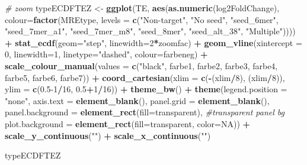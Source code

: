 \documentclass[
]{article}
\newenvironment{Shaded}{\begin{snugshade}}{\end{snugshade}}
\newcommand{\AttributeTok}[1]{\textcolor[rgb]{0.13,0.29,0.53}{#1}}
\newcommand{\CommentTok}[1]{\textcolor[rgb]{0.56,0.35,0.01}{\textit{#1}}}
\newcommand{\ConstantTok}[1]{\textcolor[rgb]{0.56,0.35,0.01}{#1}}
\newcommand{\DecValTok}[1]{\textcolor[rgb]{0.00,0.00,0.81}{#1}}
\newcommand{\FloatTok}[1]{\textcolor[rgb]{0.00,0.00,0.81}{#1}}
\newcommand{\FunctionTok}[1]{\textcolor[rgb]{0.13,0.29,0.53}{\textbf{#1}}}
\newcommand{\NormalTok}[1]{#1}
\newcommand{\OtherTok}[1]{\textcolor[rgb]{0.56,0.35,0.01}{#1}}
\newcommand{\SpecialCharTok}[1]{\textcolor[rgb]{0.81,0.36,0.00}{\textbf{#1}}}
\newcommand{\StringTok}[1]{\textcolor[rgb]{0.31,0.60,0.02}{#1}}
\begin{document}
\begin{Shaded}
\begin{Highlighting}[]
\CommentTok{\# zoom}
\NormalTok{typeECDFTEZ }\OtherTok{\textless{}{-}} \FunctionTok{ggplot}\NormalTok{(TE, }\FunctionTok{aes}\NormalTok{(}\FunctionTok{as.numeric}\NormalTok{(log2FoldChange), }
                              \AttributeTok{colour=}\FunctionTok{factor}\NormalTok{(MREtype, }\AttributeTok{levels =} \FunctionTok{c}\NormalTok{(}\StringTok{"Non{-}target"}\NormalTok{, }\StringTok{"No seed"}\NormalTok{, }\StringTok{"seed\_6mer"}\NormalTok{, }\StringTok{"seed\_7mer\_a1"}\NormalTok{, }\StringTok{"seed\_7mer\_m8"}\NormalTok{, }\StringTok{"seed\_8mer"}\NormalTok{, }\StringTok{"seed\_alt\_38"}\NormalTok{, }\StringTok{"Multiple"}\NormalTok{)))) }\SpecialCharTok{+} 
  \FunctionTok{stat\_ecdf}\NormalTok{(}\AttributeTok{geom=}\StringTok{"step"}\NormalTok{, }\AttributeTok{linewidth=}\DecValTok{2}\SpecialCharTok{*}\NormalTok{zoomfac) }\SpecialCharTok{+}
  \FunctionTok{geom\_vline}\NormalTok{(}\AttributeTok{xintercept =} \DecValTok{0}\NormalTok{, }\AttributeTok{linewidth=}\DecValTok{1}\NormalTok{, }\AttributeTok{linetype=}\StringTok{"dashed"}\NormalTok{, }\AttributeTok{colour=}\NormalTok{farbeneg) }\SpecialCharTok{+}
  \FunctionTok{scale\_colour\_manual}\NormalTok{(}\AttributeTok{values =} \FunctionTok{c}\NormalTok{(}\StringTok{"black"}\NormalTok{, farbe1, farbe2, farbe3, farbe4, farbe5, farbe6, farbe7)) }\SpecialCharTok{+}
  \FunctionTok{coord\_cartesian}\NormalTok{(}\AttributeTok{xlim =} \FunctionTok{c}\NormalTok{(}\SpecialCharTok{{-}}\NormalTok{(xlim}\SpecialCharTok{/}\DecValTok{8}\NormalTok{), (xlim}\SpecialCharTok{/}\DecValTok{8}\NormalTok{)), }\AttributeTok{ylim =} \FunctionTok{c}\NormalTok{(}\FloatTok{0.5}\DecValTok{{-}1}\SpecialCharTok{/}\DecValTok{16}\NormalTok{, }\FloatTok{0.5}\SpecialCharTok{+}\DecValTok{1}\SpecialCharTok{/}\DecValTok{16}\NormalTok{)) }\SpecialCharTok{+} 
  \FunctionTok{theme\_bw}\NormalTok{() }\SpecialCharTok{+}
  \FunctionTok{theme}\NormalTok{(}\AttributeTok{legend.position =} \StringTok{"none"}\NormalTok{, }\AttributeTok{axis.text =} \FunctionTok{element\_blank}\NormalTok{(), }\AttributeTok{panel.grid =} \FunctionTok{element\_blank}\NormalTok{(),}
        \AttributeTok{panel.background =} \FunctionTok{element\_rect}\NormalTok{(}\AttributeTok{fill=}\StringTok{\textquotesingle{}transparent\textquotesingle{}}\NormalTok{), }\CommentTok{\#transparent panel bg}
        \AttributeTok{plot.background =} \FunctionTok{element\_rect}\NormalTok{(}\AttributeTok{fill=}\StringTok{\textquotesingle{}transparent\textquotesingle{}}\NormalTok{, }\AttributeTok{color=}\ConstantTok{NA}\NormalTok{)) }\SpecialCharTok{+}
  \FunctionTok{scale\_y\_continuous}\NormalTok{(}\StringTok{""}\NormalTok{) }\SpecialCharTok{+} \FunctionTok{scale\_x\_continuous}\NormalTok{(}\StringTok{""}\NormalTok{)}

\NormalTok{typeECDFTEZ}
\end{Highlighting}
\end{Shaded}
\end{document}
